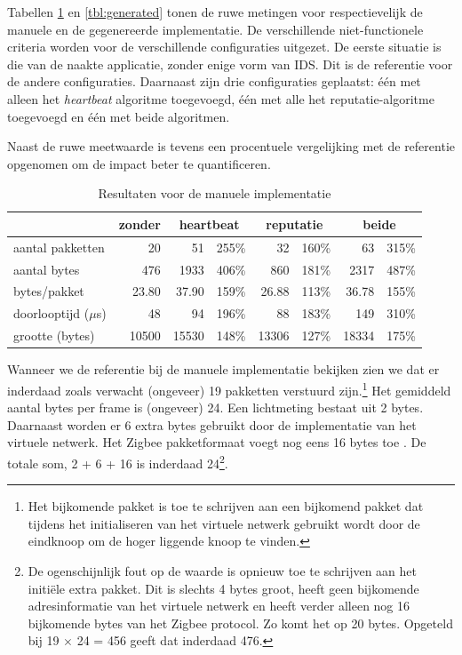 Tabellen \ref{tbl:manual} en \ref{tbl:generated} tonen de ruwe metingen voor
respectievelijk de manuele en de gegenereerde implementatie. De verschillende
niet-functionele criteria worden voor de verschillende configuraties uitgezet.
De eerste situatie is die van de naakte applicatie, zonder enige vorm van IDS.
Dit is de referentie voor de andere configuraties. Daarnaast zijn drie
configuraties geplaatst: \'e\'en met alleen het \emph{heartbeat} algoritme
toegevoegd, \'e\'en met alle het reputatie-algoritme toegevoegd en \'e\'en met
beide algoritmen.

Naast de ruwe meetwaarde is tevens een procentuele vergelijking met de
referentie opgenomen om de impact beter te quantificeren.

\begin{table}[H]
  \centering
  \begin{tabular}{l|r|rr|rr|rr}
  \hline
      & zonder & \multicolumn{2}{c|}{heartbeat} & \multicolumn{2}{c|}{reputatie} & \multicolumn{2}{c}{beide} \\
  \hline
  \hline

aantal pakketten      &    20    &    51    & 255\% &    32    & 160\% &    63    & 315\% \\
aantal bytes          &   476    &  1933    & 406\% &   860    & 181\% &  2317    & 487\% \\
bytes/pakket          &    23.80 &    37.90 & 159\% &    26.88 & 113\% &    36.78 & 155\% \\
doorlooptijd ($\mu$s) &    48    &    94    & 196\% &    88    & 183\% &   149    & 310\% \\
grootte (bytes)       & 10500    & 15530    & 148\% & 13306    & 127\% & 18334    & 175\% \\

  \hline
  \end{tabular}
  \caption{Resultaten voor de manuele implementatie}
  \label{tbl:manual}
\end{table}

Wanneer we de referentie bij de manuele implementatie bekijken zien we dat er
inderdaad zoals verwacht (ongeveer) 19 pakketten verstuurd zijn.\footnote{Het
bijkomende pakket is toe te schrijven aan een bijkomend pakket dat tijdens het
initialiseren van het virtuele netwerk gebruikt wordt door de eindknoop om de
hoger liggende knoop te vinden.} Het gemiddeld aantal bytes per frame is
(ongeveer) 24. Een lichtmeting bestaat uit 2 bytes. Daarnaast worden er 6 extra
bytes gebruikt door de implementatie van het virtuele netwerk. Het Zigbee
pakketformaat voegt nog eens 16 bytes toe \citep{alliance2012zigbee}. De totale
som, 2 + 6 + 16 is inderdaad 24\footnote{De ogenschijnlijk fout op de waarde is
opnieuw toe te schrijven aan het initi\"ele extra pakket. Dit is slechts 4
bytes groot, heeft geen bijkomende adresinformatie van het virtuele netwerk en
heeft verder alleen nog 16 bijkomende bytes van het Zigbee protocol. Zo komt
het op 20 bytes. Opgeteld bij 19 $\times$ 24 = 456 geeft dat inderdaad 476.}.

